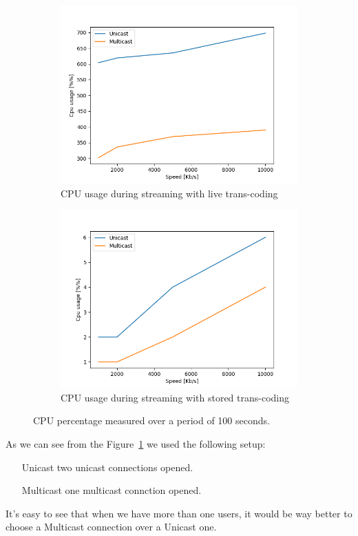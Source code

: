 \documentclass{exam}
\begin{document}
\begin{figure}[h]
    \centering
    \begin{subfigure}{0.45\textwidth}
        \centering
        \includegraphics[width=1\textwidth]{uni-vs-multi-live.png}
        \caption{CPU usage during streaming with live trans-coding}
    \end{subfigure}
    \hfill
    \begin{subfigure}{0.45\textwidth}
        \centering
        \includegraphics[width=1\textwidth]{uni-vs-multi-stored.png}
        \caption{CPU usage during streaming with stored trans-coding}
    \end{subfigure}
    \caption{CPU percentage measured over a period of 100 seconds.}
    \label{fig:cpu-usage}
\end{figure}
As we can see from the Figure~\ref{fig:cpu-usage} we used the following setup:
\begin{itemize}
\item [Unicast] two unicast connections opened.
\item [Multicast] one multicast connction opened.
\end{itemize}
It's easy to see that when we have more than one users, it would be way better to choose a Multicast connection over a Unicast one.
\end{document}
